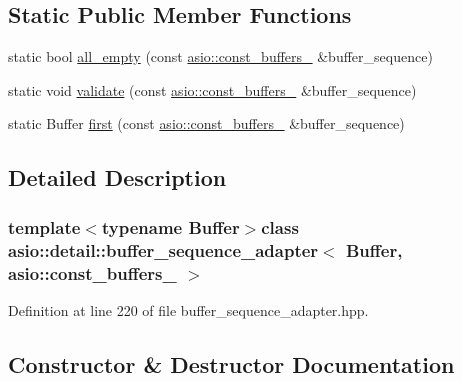 \subsection*{Static Public Member Functions}
\begin{DoxyCompactItemize}
\item 
static bool \hyperlink{classasio_1_1detail_1_1buffer__sequence__adapter_3_01_buffer_00_01asio_1_1const__buffers__1_01_4_af4c266642bd50c380e112e3d997d1bc8}{all\+\_\+empty} (const \hyperlink{classasio_1_1const__buffers__1}{asio\+::const\+\_\+buffers\+\_} \&buffer\+\_\+sequence)
\item 
static void \hyperlink{classasio_1_1detail_1_1buffer__sequence__adapter_3_01_buffer_00_01asio_1_1const__buffers__1_01_4_a56037f13c2b4cb4e1e1f216ee3e825ab}{validate} (const \hyperlink{classasio_1_1const__buffers__1}{asio\+::const\+\_\+buffers\+\_} \&buffer\+\_\+sequence)
\item 
static Buffer \hyperlink{classasio_1_1detail_1_1buffer__sequence__adapter_3_01_buffer_00_01asio_1_1const__buffers__1_01_4_a48717e4b0f1d2a521ac2b9da1a1d434d}{first} (const \hyperlink{classasio_1_1const__buffers__1}{asio\+::const\+\_\+buffers\+\_} \&buffer\+\_\+sequence)
\end{DoxyCompactItemize}


\subsection{Detailed Description}
\subsubsection*{template$<$typename Buffer$>$class asio\+::detail\+::buffer\+\_\+sequence\+\_\+adapter$<$ Buffer, asio\+::const\+\_\+buffers\+\_ $>$}



Definition at line 220 of file buffer\+\_\+sequence\+\_\+adapter.\+hpp.



\subsection{Constructor \& Destructor Documentation}
\hypertarget{classasio_1_1detail_1_1buffer__sequence__adapter_3_01_buffer_00_01asio_1_1const__buffers__1_01_4_a872630f0009e08bc4b97985a5b4f357a}{}
